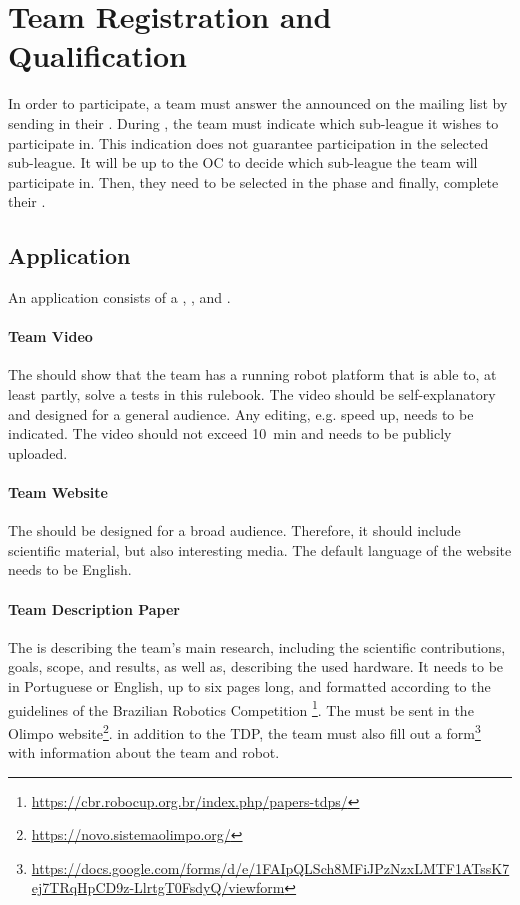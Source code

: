 \section{Team Registration and Qualification}
\label{sec:rules:particpation}

In order to participate, a team must answer the \CFP{} announced on the \AtHome{} mailing list by sending in their \Application{}. During \Application{}, the team must indicate which sub-league it wishes to participate in. This indication does not guarantee participation in the selected sub-league. It will be up to the OC to decide which sub-league the team will participate in. Then, they need to be selected in the \Qualification{} phase and finally, complete their \Registration{}.


\subsection{Application}
\label{sec:rules:application}

An application consists of a 
\TeamVideo{}, \TeamWebsite{}, and 
\TDP{}.

\paragraph{Team Video}
\label{sec:rules:application:video}
The \TeamVideo{} should show that the team has a running robot platform that is able to, at least partly, solve a tests in this rulebook. The video should be self-explanatory and designed for a general audience. Any editing, e.g. speed up, needs to be indicated. The video should not exceed \SI{10}{\minute} and needs to be publicly uploaded.


\paragraph{Team Website}
\label{sec:rules:application:website}
The \TeamWebsite{} should be designed for a broad audience. Therefore, it should include scientific material, but also interesting media. The default language of the website needs to be English.


\paragraph{Team Description Paper}
\label{sec:rules:application:tdp}
The \TDP{} is describing the team's main research, including the scientific contributions, goals, scope, and results, as well as, describing the used hardware. It needs to be in Portuguese or English, up to six pages long, and formatted according to the guidelines of the Brazilian Robotics Competition \footnote{\url{https://cbr.robocup.org.br/index.php/papers-tdps/}}. 
The \TDP{} must be sent in the Olimpo website\footnote{\url{https://novo.sistemaolimpo.org/}}.
in addition to the TDP, the team must also fill out a form\footnote{\url{https://docs.google.com/forms/d/e/1FAIpQLSch8MFiJPzNzxLMTF1ATssK7ej7TRqHpCD9z-LlrtgT0FsdyQ/viewform}} with information about the team and robot.

